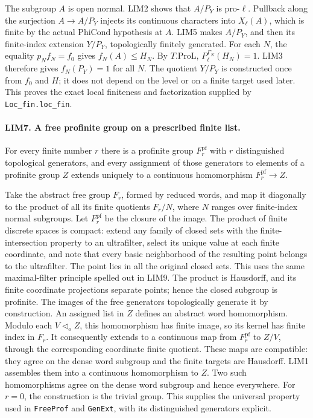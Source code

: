 The subgroup \(A\) is open normal.  LIM2 shows that \(A/P_Y\)
is pro-\(\ell\).  Pullback along the surjection \(A\to A/P_Y\)
injects its continuous characters into \(X_\ell(A)\), which is
finite by the actual \(\mathrm{PhiCond}\) hypothesis at \(A\).
LIM5 makes \(A/P_Y\), and then its finite-index extension
\(Y/P_Y\), topologically finitely generated.
For each \(N\), the equality \(p_Nf_N=f_0\) gives
\(f_N(A)\le H_N\).  By \(T.\mathrm{ProL}\),
\(P_\ell^{\Gamma_N}(H_N)=1\).
LIM3 therefore gives \(f_N(P_Y)=1\) for all \(N\).
The quotient \(Y/P_Y\) is constructed once from \(f_0\) and \(H\);
it does not depend on the level or on a finite target used later.
This proves the exact local finiteness and factorization supplied by
\texttt{Loc\_fin.loc\_fin}.

\paragraph{LIM7. A free profinite group on a prescribed finite list.}
\label{claim:LIM7}
For every finite number \(r\) there is a profinite group \(F_r^{\mathrm{pf}}\)
with \(r\) distinguished topological generators, and every assignment
of those generators to elements of a profinite group \(Z\) extends
uniquely to a continuous homomorphism \(F_r^{\mathrm{pf}}\to Z\).

Take the abstract free group \(F_r\), formed by reduced words, and
map it diagonally to the product of all its finite quotients
\(F_r/N\), where \(N\) ranges over finite-index normal subgroups.
Let \(F_r^{\mathrm{pf}}\) be the closure of the image.
The product of finite discrete spaces is compact: extend any
family of closed sets with the finite-intersection property to an
ultrafilter, select its unique value at each finite coordinate,
and note that every basic neighborhood of the resulting point
belongs to the ultrafilter.  The point lies in all the original
closed sets.  This uses the same maximal-filter principle spelled
out in LIM9.  The product is Hausdorff, and its finite coordinate
projections separate points; hence the closed subgroup is profinite.
The images of the free generators topologically generate it by
construction.  An assigned list in \(Z\) defines an abstract word
homomorphism.  Modulo each \(V\triangleleft_o Z\), this homomorphism
has finite image, so its kernel has finite index in \(F_r\).
It consequently extends to a continuous map from
\(F_r^{\mathrm{pf}}\) to \(Z/V\), through the corresponding coordinate
finite quotient.  These maps are compatible: they agree on the dense
word subgroup and the finite targets are Hausdorff.
LIM1 assembles them into a continuous homomorphism to \(Z\).
Two such homomorphisms agree on the dense word subgroup and hence
everywhere.  For \(r=0\), the construction is the trivial group.
This supplies the universal property used in \texttt{FreeProf} and
\texttt{GenExt}, with its distinguished generators explicit.

